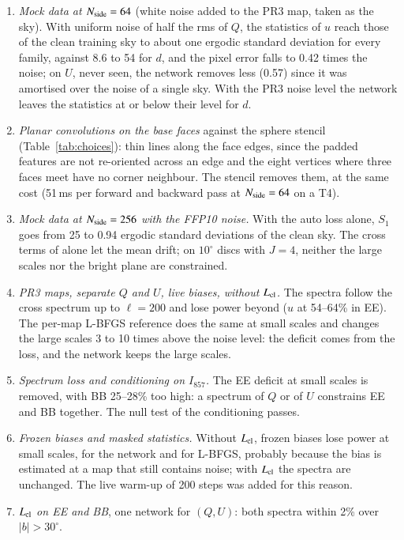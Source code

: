 \documentclass{aa}
\newcommand{\nside}{N_{\rm side}}
\begin{document}
\begin{enumerate}
  \item \emph{Mock data at $\nside=64$} (white noise added to the PR3 map, taken as the sky). With uniform noise of half the rms of $Q$, the statistics of $u$ reach those of the clean training sky to about one ergodic standard deviation for every family, against 8.6 to 54 for $d$, and the pixel error falls to 0.42 times the noise; on $U$, never seen, the network removes less (0.57) since it was amortised over the noise of a single sky. With the PR3 noise level the network leaves the statistics at or below their level for $d$.
  \item \emph{Planar convolutions on the base faces} against the sphere stencil (Table~\ref{tab:choices}): thin lines along the face edges, since the padded features are not re-oriented across an edge and the eight vertices where three faces meet have no corner neighbour. The stencil removes them, at the same cost (51\,ms per forward and backward pass at $\nside=64$ on a T4).
  \item \emph{Mock data at $\nside=256$ with the FFP10 noise.} With the auto loss alone, $S_1$ goes from 25 to 0.94 ergodic standard deviations of the clean sky. The cross terms of \citet{delouis2022} alone let the mean drift; on $10^\circ$ discs with $J=4$, neither the large scales nor the bright plane are constrained.
  \item \emph{PR3 maps, separate $Q$ and $U$, live biases, without $L_{\rm cl}$.} The spectra follow the cross spectrum up to $\ell=200$ and lose power beyond ($u$ at 54--64\% in EE). The per-map L-BFGS reference does the same at small scales and changes the large scales 3 to 10 times above the noise level: the deficit comes from the loss, and the network keeps the large scales.
  \item \emph{Spectrum loss and conditioning on $I_{857}$.} The EE deficit at small scales is removed, with BB 25--28\% too high: a spectrum of $Q$ or of $U$ constrains EE and BB together. The null test of the conditioning passes.
  \item \emph{Frozen biases and masked statistics.} Without $L_{\rm cl}$, frozen biases lose power at small scales, for the network and for L-BFGS, probably because the bias is estimated at a map that still contains noise; with $L_{\rm cl}$ the spectra are unchanged. The live warm-up of 200 steps was added for this reason.
  \item \emph{$L_{\rm cl}$ on EE and BB}, one network for $(Q,U)$: both spectra within 2\% over $|b|>30^\circ$.

\end{enumerate}
\end{document}
